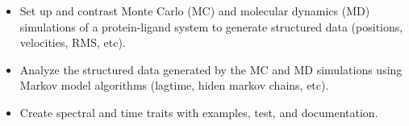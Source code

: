 \documentclass[10pt,letter,ragged2e,withhyper]{altacv}
\begin{document}
\begin{paracol}{2}




\begin{itemize}
\item Set up and contrast Monte Carlo (MC) and molecular dynamics (MD) simulations of a protein-ligand system to generate structured data (positions, velocities, RMS, etc).
\item Analyze the structured data generated by the MC and MD simulations using Markov model algorithms (lagtime, hiden markov chains, etc). %
\end{itemize}

\divider

\begin{itemize}
\item Create spectral and time traits with examples, test, and documentation. 
\end{itemize}


\divider



\end{paracol}
\end{document}
